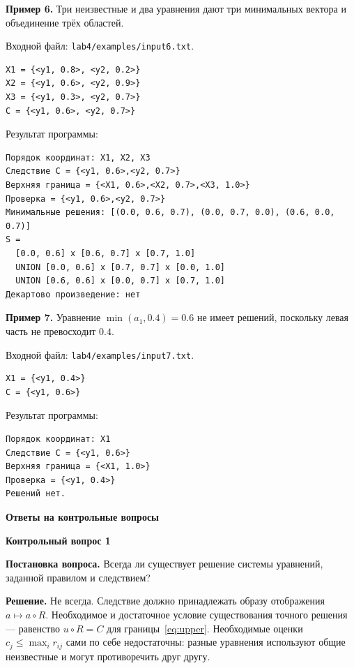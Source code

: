 \documentclass[14pt,a4paper]{extarticle}
\newcommand{\reportheading}[1]{\par\vspace{0.8\baselineskip}\noindent\textbf{#1}\par\nobreak\vspace{0.35\baselineskip}\nobreak}
\begin{document}
\par\medskip
\noindent\begin{minipage}{\textwidth}
\noindent\textbf{Пример 6.} Три неизвестные и два уравнения дают три минимальных вектора и объединение трёх областей.

Входной файл: \texttt{lab4/examples/input6.txt}.
\begin{Verbatim}[fontsize=\small,baselinestretch=1,frame=single,breaklines=true]
X1 = {<y1, 0.8>, <y2, 0.2>}
X2 = {<y1, 0.6>, <y2, 0.9>}
X3 = {<y1, 0.3>, <y2, 0.7>}
C = {<y1, 0.6>, <y2, 0.7>}
\end{Verbatim}

Результат программы:
\begin{Verbatim}[fontsize=\small,baselinestretch=1,frame=single,breaklines=true]
Порядок координат: X1, X2, X3
Следствие C = {<y1, 0.6>,<y2, 0.7>}
Верхняя граница = {<X1, 0.6>,<X2, 0.7>,<X3, 1.0>}
Проверка = {<y1, 0.6>,<y2, 0.7>}
Минимальные решения: [(0.0, 0.6, 0.7), (0.0, 0.7, 0.0), (0.6, 0.0, 0.7)]
S =
  [0.0, 0.6] x [0.6, 0.7] x [0.7, 1.0]
  UNION [0.0, 0.6] x [0.7, 0.7] x [0.0, 1.0]
  UNION [0.6, 0.6] x [0.0, 0.7] x [0.7, 1.0]
Декартово произведение: нет
\end{Verbatim}
\end{minipage}

\par\medskip
\noindent\begin{minipage}{\textwidth}
\noindent\textbf{Пример 7.} Уравнение $\min(a_1,0.4)=0.6$ не имеет решений, поскольку левая часть не превосходит $0.4$.

Входной файл: \texttt{lab4/examples/input7.txt}.
\begin{Verbatim}[fontsize=\small,baselinestretch=1,frame=single,breaklines=true]
X1 = {<y1, 0.4>}
C = {<y1, 0.6>}
\end{Verbatim}

Результат программы:
\begin{Verbatim}[fontsize=\small,baselinestretch=1,frame=single,breaklines=true]
Порядок координат: X1
Следствие C = {<y1, 0.6>}
Верхняя граница = {<X1, 1.0>}
Проверка = {<y1, 0.4>}
Решений нет.
\end{Verbatim}
\end{minipage}

\clearpage
\reportheading{Ответы на контрольные вопросы}
\reportheading{Контрольный вопрос 1}
\noindent\textbf{Постановка вопроса.} Всегда ли существует решение системы уравнений, заданной правилом и следствием?

\textbf{Решение.} Не всегда. Следствие должно принадлежать образу отображения $a\mapsto a\circ R$. Необходимое и достаточное условие существования точного решения --- равенство $u\circ R=C$ для границы~\eqref{eq:upper}. Необходимые оценки $c_j\leq\max_i r_{ij}$ сами по себе недостаточны: разные уравнения используют общие неизвестные и могут противоречить друг другу.
\end{document}
